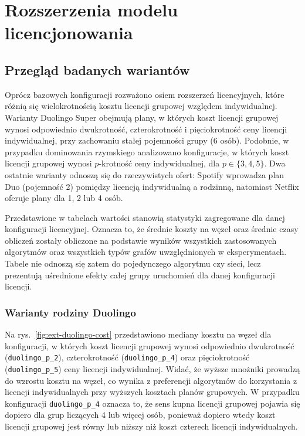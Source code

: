 \chapter{Rozszerzenia modelu licencjonowania}\label{chap:extensions}

\section{Przegląd badanych wariantów}
Oprócz bazowych konfiguracji rozważono osiem rozszerzeń licencyjnych, które różnią się wielokrotnością kosztu licencji grupowej względem indywidualnej. Warianty Duolingo Super obejmują plany, w których koszt licencji grupowej wynosi odpowiednio dwukrotność, czterokrotność i pięciokrotność ceny licencji indywidualnej, przy zachowaniu stałej pojemności grupy (6 osób). Podobnie, w przypadku dominowania rzymskiego analizowano konfiguracje, w których koszt licencji grupowej wynosi $p$-krotność ceny indywidualnej, dla $p \in \{3, 4, 5\}$. Dwa ostatnie warianty odnoszą się do rzeczywistych ofert: Spotify wprowadza plan Duo (pojemność 2) pomiędzy licencją indywidualną a rodzinną, natomiast Netflix oferuje plany dla 1, 2 lub 4 osób.

Przedstawione w tabelach wartości stanowią statystyki zagregowane dla danej konfiguracji licencyjnej. Oznacza to, że średnie koszty na węzeł oraz średnie czasy obliczeń zostały obliczone na podstawie wyników wszystkich zastosowanych algorytmów oraz wszystkich typów grafów uwzględnionych w eksperymentach. Tabele nie odnoszą się zatem do pojedynczego algorytmu czy sieci, lecz prezentują uśrednione efekty całej grupy uruchomień dla danej konfiguracji licencji.


\subsection{Warianty rodziny Duolingo}
Na rys.~\ref{fig:ext-duolingo-cost} przedstawiono mediany kosztu na węzeł dla konfiguracji, w których koszt licencji grupowej wynosi odpowiednio dwukrotność (\texttt{duolingo\_p\_2}), czterokrotność (\texttt{duolingo\_p\_4}) oraz pięciokrotność (\texttt{duolingo\_p\_5}) ceny licencji indywidualnej. Widać, że wyższe mnożniki prowadzą do wzrostu kosztu na węzeł, co wynika z preferencji algorytmów do korzystania z licencji indywidualnych przy wyższych kosztach planów grupowych. W przypadku konfiguracji \texttt{duolingo\_p\_4} oznacza to, że sens kupna licencji grupowej pojawia się dopiero dla grup liczących 4 lub więcej osób, ponieważ dopiero wtedy koszt licencji grupowej jest równy lub niższy niż koszt czterech licencji indywidualnych.

